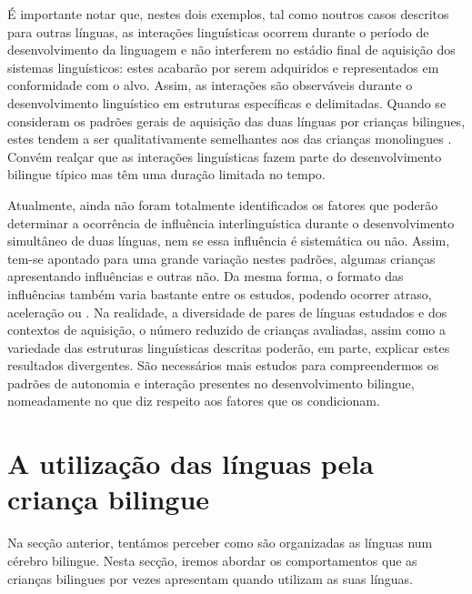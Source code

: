 \documentclass[output=paper]{LSP/langsci}
\begin{document}
É importante notar que, nestes dois exemplos, tal como noutros casos descritos para outras línguas, as interações linguísticas ocorrem durante o período de desenvolvimento da linguagem e não interferem no estádio final de aquisição dos sistemas linguísticos: estes acabarão por serem adquiridos e representados em conformidade com o alvo. Assim, as interações são observáveis durante o desenvolvimento linguístico em estruturas específicas e delimitadas. Quando se consideram os padrões gerais de aquisição das duas línguas por crianças bilingues, estes tendem a ser qualitativamente semelhantes aos das crianças monolingues \citep{genesee_etal2004,meisel2004}. Convém realçar que as interações linguísticas fazem parte do desenvolvimento bilingue típico mas têm uma duração limitada no tempo.

Atualmente, ainda não foram totalmente identificados os fatores que poderão determinar a ocorrência de influência interlinguística durante o desenvolvimento simultâneo de duas línguas, nem se essa influência é sistemática ou não. Assim, tem-se apontado para uma grande variação nestes padrões, algumas crianças apresentando influências e outras não. Da mesma forma, o formato das influências também varia bastante entre os estudos, podendo ocorrer atraso, aceleração ou . Na realidade, a diversidade de pares de línguas estudados e dos contextos de aquisição, o número reduzido de crianças avaliadas, assim como a variedade das estruturas linguísticas descritas poderão, em parte, explicar estes resultados divergentes. São necessários mais estudos para compreendermos os padrões de autonomia e interação presentes no desenvolvimento bilingue, nomeadamente no que diz respeito aos fatores que os condicionam.


\section{A utilização das línguas pela criança bilingue}%
\label{sec:almeida_utilizacao}

Na secção anterior, tentámos perceber como são organizadas as línguas num cérebro bilingue. Nesta secção, iremos abordar os comportamentos que as crianças bilingues por vezes apresentam quando utilizam as suas línguas.
\end{document}
